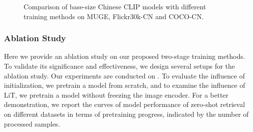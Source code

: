 \documentclass[11pt]{article}
\begin{document}
\begin{figure*}
    \centering
    \caption{Comparison of base-size Chinese CLIP models with different training methods on MUGE, Flickr30k-CN and COCO-CN.}
    \label{fig:ablation Base MR}
\end{figure*}

 \subsubsection{Ablation Study}
Here we provide an ablation study on our proposed two-stage training methods. 
To validate its significance and effectiveness, we design several setups for the ablation study. 
Our experiments are conducted on . 
To evaluate the influence of initialization, we pretrain a model from scratch, and to examine the influence of LiT, we pretrain a model without freezing the image encoder. 
For a better demonstration, we report the curves of model performance of zero-shot retrieval on different datasets in terms of pretraining progress, indicated by the number of processed samples. 
\end{document}
